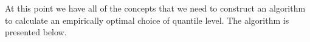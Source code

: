 At this point we have all of the concepts that we need to construct an algorithm
to calculate an empirically optimal choice of quantile level.  The algorithm is
presented below.


